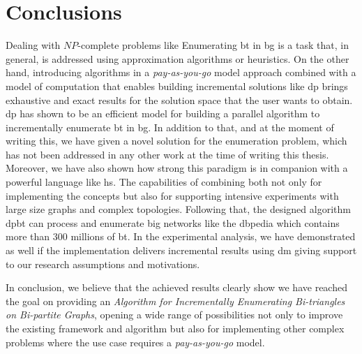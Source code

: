 \section{Conclusions}
Dealing with $NP$-complete problems like Enumerating \acrlong{bt} in \acrlong{bg} is a task that, in general, is addressed using approximation algorithms or heuristics. 
On the other hand, introducing algorithms in a \emph{pay-as-you-go} model approach combined with a model of computation that enables building incremental solutions like \acrshort{dp} brings exhaustive and exact results for the solution space that the user wants to obtain.    
\acrfull{dp} has shown to be an efficient model for building a parallel algorithm to incrementally enumerate \acrlong{bt} in \acrlong{bg}. 
In addition to that, and at the moment of writing this, we have given a novel solution for the enumeration problem, which has not been addressed in any other work at the time of writing this thesis.
Moreover, we have also shown how strong this paradigm is in companion with a powerful language like \acrfull{hs}. 
The capabilities of combining both not only for implementing the concepts but also for supporting intensive experiments with large size graphs and complex topologies. 
Following that, the designed algorithm \acrshort{dpbt} can process and enumerate big networks like the \acrlong{dbpedia} which contains more than $300$ millions of \acrlong{bt}.
In the experimental analysis, we have demonstrated as well if the implementation delivers incremental results using \acrlong{dm} giving support to our research assumptions and motivations. 

In conclusion, we believe that the achieved results clearly show we have reached the goal on providing an \emph{Algorithm for Incrementally Enumerating Bi-triangles on Bi-partite Graphs}, opening a wide range of possibilities not only to improve the existing framework and algorithm but also for implementing other complex problems where the use case requires a \emph{pay-as-you-go} model.
